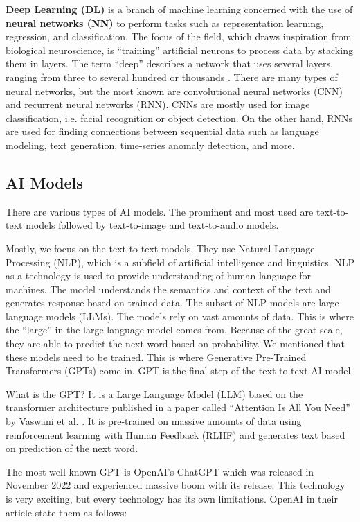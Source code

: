 \textbf{Deep Learning (DL)} is a branch of machine learning concerned with the use of \textbf{neural networks (NN)} to perform tasks such as representation learning, regression, and classification. The focus of the field, which draws inspiration from biological neuroscience, is ``training'' artificial neurons to process data by stacking them in layers. The term ``deep'' describes a network that uses several layers, ranging from three to several hundred or thousands \cite{LeCun2015}. There are many types of neural networks, but the most known are convolutional neural networks (CNN) and recurrent neural networks (RNN). CNNs are mostly used for image classification, i.e. facial recognition or object detection. On the other hand, RNNs are used for finding connections between sequential data such as language modeling, text generation, time-series anomaly detection, and more.


\subsection{AI Models \label{subsec:AI-Models}}

There are various types of AI models. The prominent and most used are text-to-text models followed by text-to-image and text-to-audio models. 

Mostly, we focus on the text-to-text models. They use Natural Language Processing (NLP), which is a subfield of artificial intelligence and linguistics. NLP as a technology is used to provide understanding of human language for machines. The model understands the semantics and context of the text and generates response based on trained data. The subset of NLP models are large language models (LLMs). The models rely on vast amounts of data. This is where the ``large'' in the large language model comes from. Because of the great scale, they are able to predict the next word based on probability. We mentioned that these models need to be trained. This is where Generative Pre-Trained Transformers (GPTs) come in. GPT is the final step of the text-to-text AI model. 

What is the GPT? It is a Large Language Model (LLM) based on the transformer architecture published in a paper called ``Attention Is All You Need'' by Vaswani et al. \cite{vaswani2023attentionneed}. It is pre-trained on massive amounts of data using reinforcement learning with Human Feedback (RLHF) \cite{openai_chatgpt_page} and generates text based on prediction of the next word.

The most well-known GPT is OpenAI's ChatGPT which was released in November 2022 and experienced massive boom with its release. This technology is very exciting, but every technology has its own limitations. OpenAI in their article \cite{openai_chatgpt_page} state them as follows:

